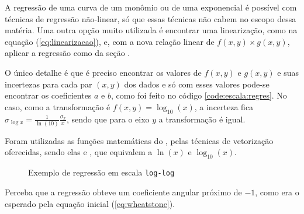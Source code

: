     A regressão de uma curva de um monômio ou de uma exponencial é possível com técnicas de regressão não-linear, só que essas técnicas não cabem no escopo dessa matéria. Uma outra opção muito utilizada é encontrar uma linearização, como na equação (\ref{eq:linearizacao}), e, com a nova relação linear de $f(x, y) \times g(x, y)$, aplicar a regressão como da seção .

    O único detalhe é que é preciso encontrar os valores de $f(x, y)$ e $g(x, y)$ e suas incertezas para cada par $(x, y)$ dos dados e só com esses valores pode-se encontrar os coeficientes $a$ e $b$, como foi feito no código \ref{code:escala:regres}. No caso, como a transformação é $f(x, y) = \log_{10}(x)$, a incerteza fica $\sigma_{\log x} = \frac{1}{\ln(10)} \frac{\sigma_x}{x}$, sendo que para o eixo $y$ a transformação é igual.

    Foram utilizadas as funções matemáticas do \numpy, pelas técnicas de vetorização oferecidas, sendo elas  e , que equivalem a $\ln(x)$ e $\log_{10}(x)$.

    \begin{figure}[H]
        \centering
        

        \caption{Exemplo de regressão em escala \texttt{log-log}}
        \label{fig:escala:regres}
    \end{figure}

    Perceba que a regressão obteve um coeficiente angular próximo de $-1$, como era o esperado pela equação inicial (\ref{eq:wheatstone}).
